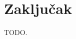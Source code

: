 \documentclass[times, utf8, seminar]{fit}
\begin{document}












\chapter{Zaključak}

TODO.



\end{document}

